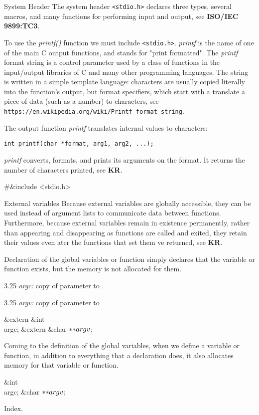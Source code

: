 System Header \hfill \break
The system header {\tt <stdio.h>} declares three types, several macros, and
many functions for performing input and output, see {\bf ISO/IEC 9899:TC3}.

\vskip 2pt \noindent
To use the {\sl printf()} function we must include {\tt <stdio.h>}.
{\sl printf} is the name of one of the main C output functions, and stands for
"print formatted". The {\sl printf} format string is a control parameter used
by
a class of functions in the input/output libraries of C and many other
programming languages. The string is written in a simple template language:
characters are usually copied literally into the function's output, but format
specifiers, which start with a %
translate a piece of data (such as a number) to characters, see
{\tt https://en.wikipedia.org/wiki/Printf\_format\_string}.

\vskip 2pt \noindent
The output function {\sl printf} translates internal values to characters:

\vskip 2pt \noindent
{\tt int printf(char *format, arg1, arg2, ...); }

\vskip 2pt \noindent
{\sl printf} converts, formats, and prints its arguments on the
format. It returns the number of characters printed, see {\bf KR}.

\Y\B\8\#\&{include} \.{<stdio.h>}\par
\fi

External variables \hfill \break
Because external variables are globally accessible, they can be used instead of
argument lists to communicate data between functions. Furthermore, because
external variables remain in existence permanently, rather than appearing and
disappearing as functions are called and exited, they retain their values even
ater the functions that set them ve returned, see {\bf KR}.

Declaration of the global variables or function simply declares that the
variable or function exists, but the memory is not allocated for them.

\vskip 2pt
 3.25 {\sl argc:} copy of  parameter to .

 3.25 {\sl argv:}  copy of  parameter to 

\Y\B\&{extern} \&{int} \\{argc};\6
\&{extern} \&{char} ${}{*}{*}\\{argv}{}$;\par
\fi

Coming to the definition of the global variables, when we define a
variable or
function, in addition to everything that a declaration does, it also allocates
memory for that variable or function.

\Y\B\&{int} \\{argc};\6
\&{char} ${}{*}{*}\\{argv}{}$;\par
\fi

Index.
\fi

\inx
\fin
\con
